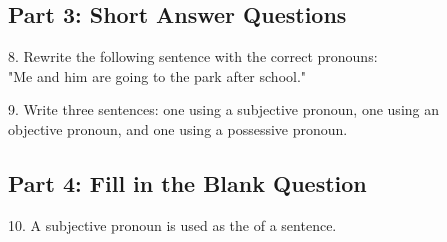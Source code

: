 \documentclass[12pt]{article}
\begin{document}

\subsection*{Part 3: Short Answer Questions}

8. Rewrite the following sentence with the correct pronouns:  
\\"Me and him are going to the park after school."  
\vspace{3cm}

9. Write three sentences: one using a subjective pronoun, one using an \\objective pronoun, and one using a possessive pronoun.  
\vspace{3cm}

\subsection*{Part 4: Fill in the Blank Question}

10. A subjective pronoun is used as the \underline{\hspace{4cm}} of a sentence.  
\vspace{2cm}








\end{document}
